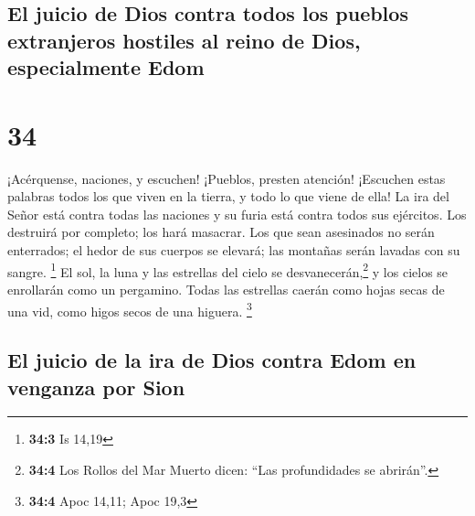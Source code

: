 \hypertarget{el-juicio-de-dios-contra-todos-los-pueblos-extranjeros-hostiles-al-reino-de-dios-especialmente-edom}{%
\subsection{El juicio de Dios contra todos los pueblos extranjeros
hostiles al reino de Dios, especialmente
Edom}\label{el-juicio-de-dios-contra-todos-los-pueblos-extranjeros-hostiles-al-reino-de-dios-especialmente-edom}}

\hypertarget{section-33}{%
\section{34}\label{section-33}}

 ¡Acérquense, naciones, y escuchen! ¡Pueblos, presten
atención! ¡Escuchen estas palabras todos los que viven en la tierra, y
todo lo que viene de ella!  La ira del Señor está contra
todas las naciones y su furia está contra todos sus ejércitos. Los
destruirá por completo; los hará masacrar.  Los que sean
asesinados no serán enterrados; el hedor de sus cuerpos se elevará; las
montañas serán lavadas con su sangre. \footnote{\textbf{34:3} Is 14,19}
 El sol, la luna y las estrellas del cielo se
desvanecerán,\footnote{\textbf{34:4} Los Rollos del Mar Muerto dicen:
  ``Las profundidades se abrirán''.} y los cielos se enrollarán como un
pergamino. Todas las estrellas caerán como hojas secas de una vid, como
higos secos de una higuera. \footnote{\textbf{34:4} Apoc 14,11; Apoc
  19,3}

\hypertarget{el-juicio-de-la-ira-de-dios-contra-edom-en-venganza-por-sion}{%
\subsection{El juicio de la ira de Dios contra Edom en venganza por
Sion}\label{el-juicio-de-la-ira-de-dios-contra-edom-en-venganza-por-sion}}

